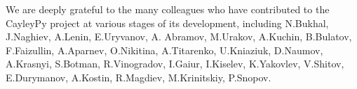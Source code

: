 \documentclass[atmp]{ipart_v1}
\numberwithin{equation}{section}
\theoremstyle{plain}%
\begin{document}
We are deeply grateful to the many colleagues who have contributed to the CayleyPy project at various stages of its development, including N.Bukhal, J.Naghiev, A.Lenin, E.Uryvanov,  A. Abramov, M.Urakov, A.Kuchin,  B.Bulatov,  F.Faizullin, A.Aparnev, O.Nikitina, A.Titarenko, U.Kniaziuk, D.Naumov, A.Krasnyi, S.Botman,
R.Vinogradov, I.Gaiur, I.Kiselev,  %
K.Yakovlev, V.Shitov, E.Durymanov, A.Kostin, R.Magdiev, M.Krinitskiy, P.Snopov. 






\end{document}
